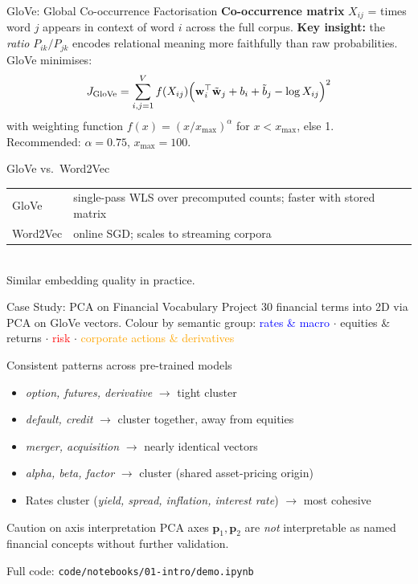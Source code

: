 \documentclass[9pt,t]{beamer}
\begin{document}
\begin{frame}[noframenumbering]{GloVe: Global Co-occurrence Factorisation}
  \textbf{Co-occurrence matrix} $X_{ij}$ = times word $j$ appears in context of word $i$ across the full corpus.
  \medskip
  \textbf{Key insight:} the \emph{ratio} $P_{ik}/P_{jk}$ encodes relational meaning more faithfully than raw probabilities.
  \medskip
  GloVe minimises:
  \[
    J_{\mathrm{GloVe}}
    = \sum_{i,j=1}^{V}
      f(X_{ij})
      \Bigl(\mathbf{w}_i^{\top} \tilde{\mathbf{w}}_j + b_i + \tilde{b}_j - \log X_{ij}\Bigr)^{2}
  \]
  with weighting function $f(x) = (x/x_{\max})^{\alpha}$ for $x < x_{\max}$, else 1.
  Recommended: $\alpha = 0.75$, $x_{\max} = 100$.
  \medskip
  \begin{block}{GloVe vs.\ Word2Vec}
    \begin{tabular}{@{}ll@{}}
      GloVe & single-pass WLS over precomputed counts; faster with stored matrix \\
      Word2Vec & online SGD; scales to streaming corpora \\
    \end{tabular}\\
    Similar embedding quality in practice.
  \end{block}
\end{frame}

\begin{frame}[noframenumbering]{Case Study: PCA on Financial Vocabulary}
  Project 30 financial terms into 2D via PCA on GloVe vectors.
  Colour by semantic group:
  \textcolor{blue}{rates \& macro} $\cdot$
  \textcolor{green!60!black}{equities \& returns} $\cdot$
  \textcolor{red}{risk} $\cdot$
  \textcolor{orange}{corporate actions \& derivatives}
  \medskip
  \begin{block}{Consistent patterns across pre-trained models}
    \begin{itemize}
      \item \textit{option, futures, derivative} $\to$ tight cluster
      \item \textit{default, credit} $\to$ cluster together, away from equities
      \item \textit{merger, acquisition} $\to$ nearly identical vectors
      \item \textit{alpha, beta, factor} $\to$ cluster (shared asset-pricing origin)
      \item Rates cluster (\textit{yield, spread, inflation, interest rate}) $\to$ most cohesive
    \end{itemize}
  \end{block}
  \begin{alertblock}{Caution on axis interpretation}
    PCA axes $\mathbf{p}_1, \mathbf{p}_2$ are \emph{not} interpretable as named financial concepts without further validation.
  \end{alertblock}
  Full code: \texttt{code/notebooks/01-intro/demo.ipynb}
\end{frame}
\end{document}
